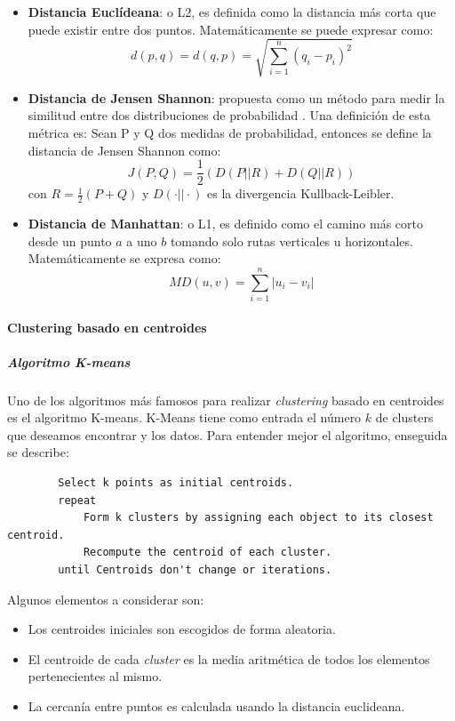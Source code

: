     \begin{itemize}
        \item \textbf{Distancia Euclídeana}: o L2,  es definida como la distancia más corta que puede existir entre dos puntos. Matemáticamente se puede expresar como:
        \begin{equation*}
            d(p,q) = d(q,p) =\sqrt{\sum_{i=1}^n\left(q_i-p_i\right)^2}
        \end{equation*}
        \item \textbf{Distancia de Jensen Shannon}: propuesta como un método para medir la similitud entre dos distribuciones de probabilidad \cite{endres2003new}. Una definición de esta métrica es: Sean P y Q dos medidas de probabilidad, entonces se define la distancia de Jensen Shannon como:
        \begin{equation*}
        J(P,Q) = \frac{1}{2}\left(D(P||R)+D(Q||R)\right)
        \end{equation*}
        con $R=\frac{1}{2}(P+Q)$ y $D(\cdot||\cdot)$ es la divergencia Kullback-Leibler.
        \item \textbf{Distancia de Manhattan}: o L1, es definido como el camino más corto desde un punto $a$ a uno $b$ tomando solo rutas verticales u horizontales. Matemáticamente se expresa como:
        \begin{equation*}
            MD(u,v) = \sum_{i=1}^n \left|u_i - v_i\right|
        \end{equation*}
    \end{itemize}
    
\newpage    
    
\paragraph{Clustering basado en centroides}
\subparagraph{Algoritmo K-means}
\subparagraph*{}
    Uno de los algoritmos más famosos para realizar \textit{clustering} basado en centroides es el algoritmo K-means. K-Means tiene como entrada el número $k$ de clusters que deseamos encontrar y los datos.  Para entender mejor el algoritmo, enseguida se describe:
    \begin{lstlisting}
        Select k points as initial centroids.
        repeat
            Form k clusters by assigning each object to its closest centroid.
            Recompute the centroid of each cluster.
        until Centroids don't change or iterations.
    \end{lstlisting}
    Algunos elementos a considerar son:
    \begin{itemize}
        \item Los centroides iniciales son escogidos de forma aleatoria.
        \item El centroide de cada \textit{cluster} es la media aritmética de todos los elementos pertenecientes al mismo.
        \item La cercanía entre puntos es calculada usando la distancia euclideana.
    \end{itemize}
